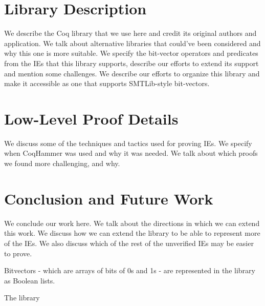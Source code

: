 \documentclass[submission,copyright,creativecommons]{eptcs}
\begin{document}
\section{Library Description}
We describe the Coq library that we use here and credit its original authors and application. We talk about alternative 
libraries that could've been considered and why this 
one is more suitable. We specify the bit-vector 
operators and predicates from the IEs that this library 
supports, describe our efforts to extend its support 
and mention some challenges. We describe our efforts 
to organize this library and make it accessible 
as one that supports SMTLib-style bit-vectors. 

\section{Low-Level Proof Details}
We discuss some of the techniques and tactics used for 
proving IEs. We specify when CoqHammer was used and why 
it was needed. We talk about which proofs we 
found more challenging, and why. 

\section{Conclusion and Future Work}
We conclude our work here. We talk about the directions 
in which we can extend this work. We discuss how we can 
extend the library to be able to represent more of the IEs.
We also discuss which of the rest of the unverified IEs may 
be easier to prove. 

Bitvectors - which are arrays of bits of 0s and 1s - 
are represented in the library as Boolean lists.

The library



\end{document}
